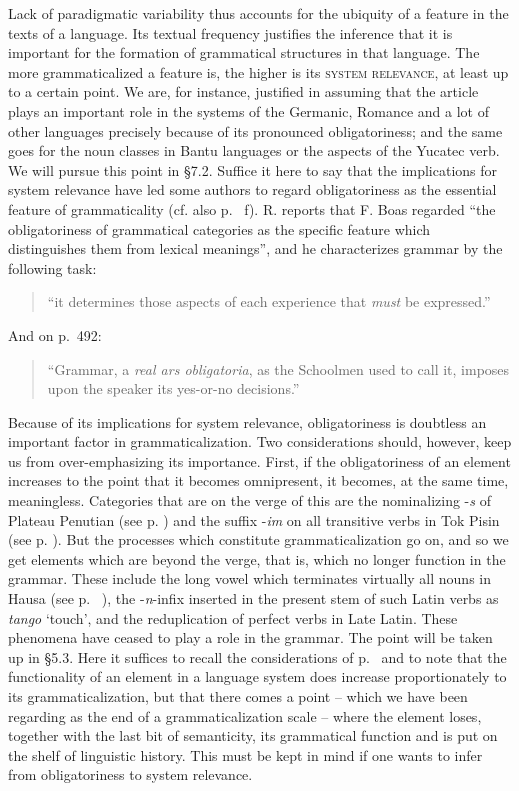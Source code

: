 Lack of paradigmatic variability thus accounts for the ubiquity of a feature in the texts of a language. Its textual frequency justifies the inference that it is important for the formation of grammatical structures in that language. The more grammaticalized a feature is, the higher is its \textsc{system relevance}, at least up to a certain point. We are, for instance, justified in assuming that the article plays an important role in the systems of the Germanic, Romance and a lot of other languages precisely because of its pronounced obligatoriness; and the same goes for the noun classes in Bantu languages or the aspects of the Yucatec verb. We will pursue this point in §7.2. Suffice it here to say that the implications for system relevance have led some authors to regard obligatoriness as the essential feature of grammaticality (cf. also p.~\pageref{page14b}\chk%
f). R. \citet[489]{Jakobson1959} reports that F. Boas regarded “the obligatoriness of grammatical categories as the specific feature which distinguishes them from lexical meanings”, and he characterizes grammar by the following task:

\begin{quote}
“it determines those aspects of each experience that \textit{must} be expressed.”
\end{quote}

\noindent And on p.~492:
\begin{quote}
“Grammar, a \textit{real ars obligatoria}, as the Schoolmen used to call it, imposes upon the speaker its yes-or-no decisions.”
\end{quote}

\noindent Because of its implications for system relevance, obligatoriness is doubtless an important factor in grammaticalization. Two considerations should, however, keep us from over-emphasizing its importance. First, if the obligatoriness of an element increases to the point that it becomes omnipresent, it becomes, at the same time, meaningless. Categories that are on the verge of this are the nominalizing -\textit{s} of Plateau Penutian (see p. \pageref{PlateauPenutian}) and the suffix -\textit{im} on all transitive verbs in Tok Pisin (see p. \pageref{ex:E11}). But the processes which constitute grammaticalization go on, and so we get elements which are beyond the verge, that is, which no longer function in the grammar. These include the long vowel which terminates virtually all nouns in Hausa (see p.~\pageref{page59}\chk%
), the -\textit{n}{}-infix inserted in the present stem of such Latin verbs as \textit{tango} ‘touch’, and the reduplication of perfect verbs in Late Latin. These phenomena have ceased to play a role in the grammar. The point will be taken up in §5.3. Here it suffices to recall the considerations of p.~\pageref{page141b}\chk%
 and to note that the functionality of an element in a language system does increase proportionately to its grammaticalization, but that there comes a point -- which we have been regarding as the end of a grammaticalization scale -- where the element loses, together with the last bit of semanticity, its grammatical function and is put on the shelf of linguistic history. This must be kept in mind if one wants to infer from obligatoriness to system relevance.

